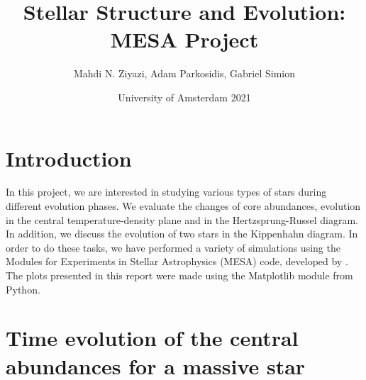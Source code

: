 \documentclass{article}
\title{Stellar Structure and Evolution: MESA Project}
\author{Mahdi N. Ziyazi, Adam Parkosidis, Gabriel Simion}
\date{University of Amsterdam 2021}
\begin{document}
\maketitle 


\section*{Introduction}

In this project, we are interested in studying various types of stars during different evolution phases. We evaluate the changes of core abundances, evolution in the central temperature-density plane and in the Hertzsprung-Russel diagram. In addition, we discuss the evolution of two stars in the Kippenhahn diagram. In order to do these tasks, we have performed a variety of simulations using the Modules for Experiments in Stellar Astrophysics (MESA) code, developed by \citet{paxton2010modules}. The plots presented in this report were made using the Matplotlib module from Python.



\section{Time evolution of the central abundances for a massive star}
\end{document}
